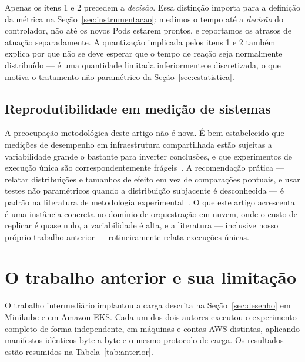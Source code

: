 \documentclass[conference]{IEEEtran}
\begin{document}
Apenas os itens 1 e 2 precedem a \emph{decisão}. Essa distinção importa para a
definição da métrica na Seção~\ref{sec:instrumentacao}: medimos o tempo até a
\emph{decisão} do controlador, não até os novos Pods estarem prontos, e
reportamos os atrasos de atuação separadamente. A quantização implicada pelos
itens 1 e 2 também explica por que não se deve esperar que o tempo de reação seja
normalmente distribuído --- é uma quantidade limitada inferiormente e
discretizada, o que motiva o tratamento não paramétrico da
Seção~\ref{sec:estatistica}.

\subsection{Reprodutibilidade em medição de sistemas}

A preocupação metodológica deste artigo não é nova. É bem estabelecido que
medições de desempenho em infraestrutura compartilhada estão sujeitas a
variabilidade grande o bastante para inverter conclusões, e que experimentos de
execução única são correspondentemente frágeis~\cite{mytkowicz, hoefler}. A
recomendação prática --- relatar distribuições e tamanhos de efeito em vez de
comparações pontuais, e usar testes não paramétricos quando a distribuição
subjacente é desconhecida --- é padrão na literatura de metodologia
experimental~\cite{arcuri}. O que este artigo acrescenta é uma instância concreta
no domínio de orquestração em nuvem, onde o custo de replicar é quase nulo, a
variabilidade é alta, e a literatura --- inclusive nosso próprio trabalho
anterior --- rotineiramente relata execuções únicas.

\section{O trabalho anterior e sua limitação}
\label{sec:anterior}

O trabalho intermediário implantou a carga descrita na
Seção~\ref{sec:desenho} em Minikube e em Amazon EKS. Cada um dos dois autores
executou o experimento completo de forma independente, em máquinas e contas AWS
distintas, aplicando manifestos idênticos byte a byte e o mesmo protocolo de
carga. Os resultados estão resumidos na Tabela~\ref{tab:anterior}.
\end{document}
